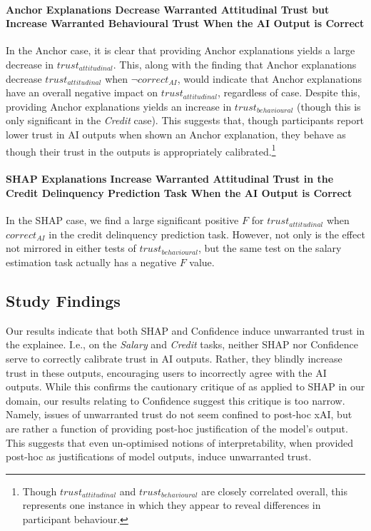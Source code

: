 \paragraph{Anchor Explanations Decrease Warranted Attitudinal Trust but Increase Warranted Behavioural Trust When the AI Output is Correct}
In the Anchor case, it is clear that providing Anchor explanations yields a large decrease in $trust_{attitudinal}$. This, along with the finding that Anchor explanations decrease $trust_{attitudinal}$ when $\neg correct_{AI}$, would indicate that Anchor explanations have an overall negative impact on $trust_{attitudinal}$, regardless of case. Despite this, providing Anchor explanations yields an increase in $trust_{behavioural}$ (though this is only significant in the \emph{Credit} case). This suggests that, though participants report lower trust in AI outputs when shown an Anchor explanation, they behave as though their trust in the outputs is appropriately calibrated.\footnote{Though $trust_{attitudinal}$ and $trust_{behavioural}$ are closely correlated overall, this represents one instance in which they appear to reveal differences in participant behaviour.}

\paragraph{SHAP Explanations Increase Warranted Attitudinal Trust in the Credit Delinquency Prediction Task When the AI Output is Correct}
In the SHAP case, we find a large significant positive $F$ for $trust_{attitudinal}$ when $correct_{AI}$ in the credit delinquency prediction task. However, not only is the effect not mirrored in either tests of $trust_{behavioural}$, but the same test on the salary estimation task actually has a negative $F$ value.

\subsection{Study Findings}\label{ssec:os_discussion}
Our results indicate that both SHAP and Confidence induce unwarranted trust in the explainee. I.e., on the \emph{Salary} and \emph{Credit} tasks, neither SHAP nor Confidence serve to correctly calibrate trust in AI outputs. Rather, they blindly increase trust in these outputs, encouraging users to incorrectly agree with the AI outputs. While this confirms the cautionary critique of \textcite{Lipton} as applied to SHAP in our domain, our results relating to Confidence suggest this critique is too narrow. Namely, issues of unwarranted trust do not seem confined to post-hoc xAI, but are rather a function of providing post-hoc justification of the model's output. This suggests that even un-optimised notions of interpretability, when provided post-hoc as justifications of model outputs, induce unwarranted trust.

